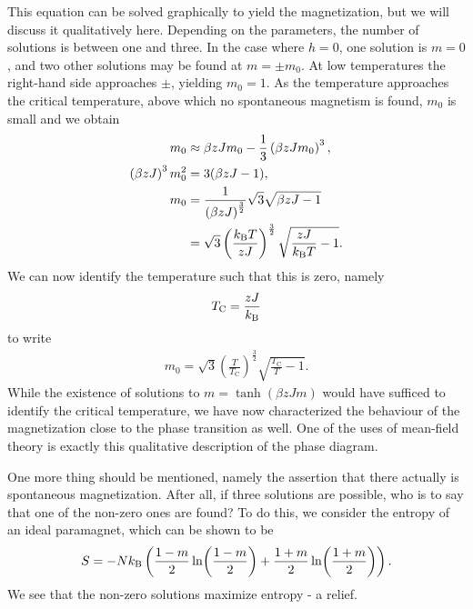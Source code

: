 This equation can be solved graphically to yield the magnetization, but we will discuss it qualitatively here. Depending on the parameters, the number of solutions is between one and three. In the case where $h = 0$, one solution is $m = 0$, and two other solutions may be found at $m = \pm m_{0}$. At low temperatures the right-hand side approaches $\pm$, yielding $m_{0} = 1$. As the temperature approaches the critical temperature, above which no spontaneous magnetism is found, $m_{0}$ is small and we obtain
\begin{align*}
	m_{0}                              &\approx \beta zJm_{0} - \frac{1}{3}\left(\beta zJm_{0}\right)^{3}, \\
	\left(\beta zJ\right)^{3}m_{0}^{2} &= 3(\beta zJ - 1), \\
	m_{0}                              &= \frac{1}{\left(\beta zJ\right)^{\frac{3}{2}}}\sqrt{3}\sqrt{\beta zJ - 1} \\
	                                   &= \sqrt{3}\left(\frac{k_{\text{B}} T}{zJ}\right)^{\frac{3}{2}}\sqrt{\frac{zJ}{k_{\text{B}} T} - 1}.
\end{align*}
We can now identify the temperature such that this is zero, namely
\begin{align*}
	T_{\text{C}} = \frac{zJ}{k_{\text{B}}}
\end{align*}
to write
\begin{align*}
	m_{0} = \sqrt{3}\left(\frac{T}{T_{\text{C}}}\right)^{\frac{3}{2}}\sqrt{\frac{T_{\text{C}}}{T} - 1}.
\end{align*}
While the existence of solutions to $m = \tanh(\beta zJm)$ would have sufficed to identify the critical temperature, we have now characterized the behaviour of the magnetization close to the phase transition as well. One of the uses of mean-field theory is exactly this qualitative description of the phase diagram.

One more thing should be mentioned, namely the assertion that there actually is spontaneous magnetization. After all, if three solutions are possible, who is to say that one of the non-zero ones are found? To do this, we consider the entropy of an ideal paramagnet, which can be shown to be
\begin{align*}
	S = -Nk_{\text{B}}\left(\frac{1 - m}{2}\ln(\frac{1 - m}{2}) + \frac{1 + m}{2}\ln(\frac{1 + m}{2})\right).
\end{align*}
We see that the non-zero solutions maximize entropy - a relief.